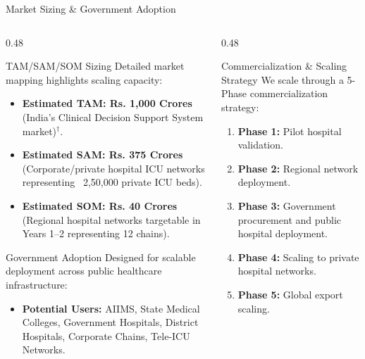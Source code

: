 \documentclass[aspectratio=169, 11pt]{beamer}
\begin{document}
\begin{frame}{Market Sizing \& Government Adoption}
    \begin{columns}[t]
        \begin{column}{0.48\textwidth}
            \begin{block}{\textcolor{neonCyan}{TAM/SAM/SOM Sizing}}
                \scriptsize
                Detailed market mapping highlights scaling capacity:
                \begin{itemize}
                    \item \textbf{Estimated TAM: Rs. 1,000 Crores} (India's Clinical Decision Support System market)$^\dagger$.
                    \item \textbf{Estimated SAM: Rs. 375 Crores} (Corporate/private hospital ICU networks representing ~2,50,000 private ICU beds).
                    \item \textbf{Estimated SOM: Rs. 40 Crores} (Regional hospital networks targetable in Years 1--2 representing 12 chains).
                \end{itemize}
            \end{block}
            
            \begin{block}{\textcolor{neonTeal}{Government Adoption}}
                \scriptsize
                Designed for scalable deployment across public healthcare infrastructure:
                \begin{itemize}
                    \item \textbf{Potential Users:} AIIMS, State Medical Colleges, Government Hospitals, District Hospitals, Corporate Chains, Tele-ICU Networks.
                \end{itemize}
            \end{block}
        \end{column}
        
        \begin{column}{0.48\textwidth}
            \begin{block}{\textcolor{neonAmber}{Commercialization \& Scaling Strategy}}
                \scriptsize
                We scale through a 5-Phase commercialization strategy:
                \begin{enumerate}
                    \item \textbf{Phase 1:} Pilot hospital validation.
                    \item \textbf{Phase 2:} Regional network deployment.
                    \item \textbf{Phase 3:} Government procurement and public hospital deployment.
                    \item \textbf{Phase 4:} Scaling to private hospital networks.
                    \item \textbf{Phase 5:} Global export scaling.
                \end{enumerate}
            \end{block}
        \end{column}
    \end{columns}
\end{frame}
\end{document}
